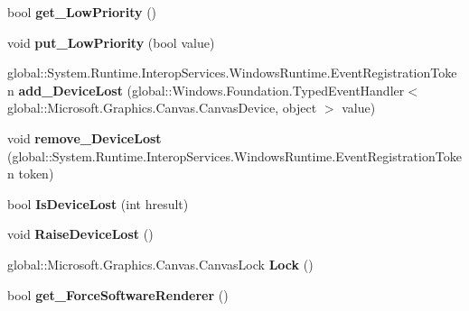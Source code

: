 \begin{DoxyCompactItemize}
bool {\bfseries get\+\_\+\+Low\+Priority} ()
\item 
\mbox{\label{interface_microsoft_1_1_graphics_1_1_canvas_1_1_i_canvas_device_a82a3e875104020e0b8e886b72df60554}} 
void {\bfseries put\+\_\+\+Low\+Priority} (bool value)
\item 
\mbox{\label{interface_microsoft_1_1_graphics_1_1_canvas_1_1_i_canvas_device_a883498a6511789a253e054e8db8972ac}} 
global\+::\+System.\+Runtime.\+Interop\+Services.\+Windows\+Runtime.\+Event\+Registration\+Token {\bfseries add\+\_\+\+Device\+Lost} (global\+::\+Windows.\+Foundation.\+Typed\+Event\+Handler$<$ global\+::\+Microsoft.\+Graphics.\+Canvas.\+Canvas\+Device, object $>$ value)
\item 
\mbox{\label{interface_microsoft_1_1_graphics_1_1_canvas_1_1_i_canvas_device_a4423eb62fed2e41b1e8429993ad3b1f1}} 
void {\bfseries remove\+\_\+\+Device\+Lost} (global\+::\+System.\+Runtime.\+Interop\+Services.\+Windows\+Runtime.\+Event\+Registration\+Token token)
\item 
\mbox{\label{interface_microsoft_1_1_graphics_1_1_canvas_1_1_i_canvas_device_adb664badebd02d30b2beead4a270a634}} 
bool {\bfseries Is\+Device\+Lost} (int hresult)
\item 
\mbox{\label{interface_microsoft_1_1_graphics_1_1_canvas_1_1_i_canvas_device_a6b74db4223ca531731fcff1891a390d8}} 
void {\bfseries Raise\+Device\+Lost} ()
\item 
\mbox{\label{interface_microsoft_1_1_graphics_1_1_canvas_1_1_i_canvas_device_ac7789f0058908fdfff7cf83b25227a23}} 
global\+::\+Microsoft.\+Graphics.\+Canvas.\+Canvas\+Lock {\bfseries Lock} ()
\item 
\mbox{\label{interface_microsoft_1_1_graphics_1_1_canvas_1_1_i_canvas_device_a71ebd55a219b2267a83a68fa3caf42a0}} 
bool {\bfseries get\+\_\+\+Force\+Software\+Renderer} ()

\end{DoxyCompactItemize}
